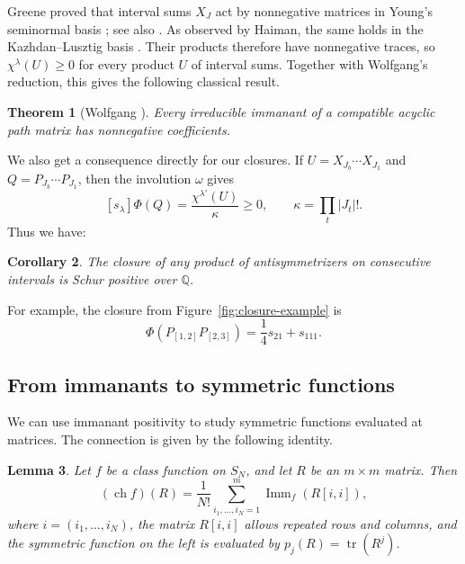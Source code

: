 \documentclass[11pt]{article}
\newtheorem{theorem}{Theorem}[section]
\newtheorem{lemma}[theorem]{Lemma}
\newtheorem{corollary}[theorem]{Corollary}
\theoremstyle{definition}
\theoremstyle{remark}
\newcommand{\tr}{\operatorname{tr}}
\newcommand{\Imm}{\operatorname{Imm}}
\newcommand{\ch}{\operatorname{ch}}
\begin{document}
Greene proved that interval sums $X_J$ act by
nonnegative matrices in Young's seminormal basis
\cite{GJ,Greene}; see also
\cite[Theorem~5.1]{Stembridge92}.
As observed by Haiman, the same holds in the
Kazhdan--Lusztig basis
\cite[footnote to Theorem~5.1]{Stembridge92}.
Their products therefore have nonnegative traces,
so $\chi^\lambda(U)\ge0$ for every product $U$
of interval sums.
 Together with Wolfgang's reduction,
this gives the following classical result.

\begin{theorem}[{Wolfgang
\cite[Corollary~2.6.5]{Wolfgang}}]\label{thm:wolfgang}
Every irreducible immanant of a compatible acyclic
path matrix has nonnegative coefficients.
\end{theorem}

We also get a consequence directly for our closures.
If $U=X_{J_b}\cdots X_{J_1}$ and
$Q=P_{J_b}\cdots P_{J_1}$, then the
involution $\omega$ gives
\[
[s_\lambda]\Phi(Q)
=\frac{\chi^{\lambda'}(U)}{\kappa}\ge0,
\qquad \kappa=\prod_t |J_t|!.
\]
Thus we have:

\begin{corollary}\label{cor:closure}
The closure of any product of antisymmetrizers
on consecutive intervals is Schur positive
over $\mathbb Q$.
\end{corollary}

For example, the closure from
Figure~\ref{fig:closure-example} is
\[
\Phi(P_{[1,2]}P_{[2,3]})
=\frac14s_{21}+s_{111}.
\]



\subsection{From immanants to symmetric functions}

We can use immanant positivity to study symmetric
functions evaluated at matrices. The connection is
given by the following identity.

\begin{lemma}\label{lem:frobenius-immanant}
Let $f$ be a class function on $S_N$, and let $R$
be an $m\times m$ matrix. Then
\begin{equation}\label{eq:SchurImm}
(\ch f)(R)=\frac1{N!}
\sum_{i_1,\ldots,i_N=1}^m \Imm_f(R[i,i]),
\end{equation}
where $i=(i_1,\ldots,i_N)$, the matrix $R[i,i]$
allows repeated rows and columns, and the
symmetric function on the left is evaluated
by $p_j(R)=\tr(R^j)$.
\end{lemma}
\end{document}
